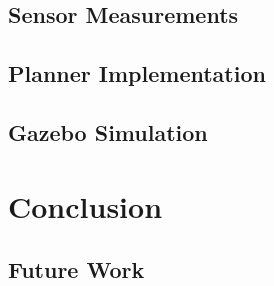 \documentclass[conference]{IEEEtran} \usepackage[T1]{fontenc} \usepackage[backend=biber, style=ieee]{biblatex}
\begin{document}
\subsection{Sensor Measurements} \label{Sensor Measurements}

\subsection{Planner Implementation} \label{Planner Implementation}

\subsection{Gazebo Simulation} \label{Gazebo Simulation}

\section{Conclusion} \label{Conclusion} 

\subsection{Future Work}

\printbibliography
\end{document}
